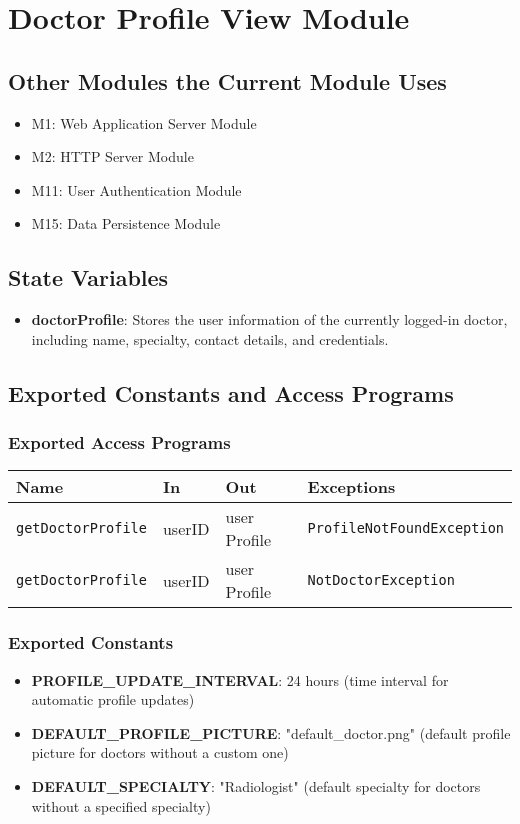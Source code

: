 \documentclass[12pt, titlepage]{article}
\begin{document}
\section{Doctor Profile View Module}

\subsection{Other Modules the Current Module Uses}
\begin{itemize}
    \item M1: Web Application Server Module
    \item M2: HTTP Server Module
    \item M11: User Authentication Module
    \item M15: Data Persistence Module
\end{itemize}

\subsection{State Variables}
\begin{itemize}
    \item \textbf{doctorProfile}: Stores the user information of the currently logged-in doctor, including name, specialty, contact details, and credentials.
\end{itemize}

\subsection{Exported Constants and Access Programs}
\subsubsection{Exported Access Programs}
\begin{tabular}{|l|l|l|l|}
    \hline
    \textbf{Name} & \textbf{In} & \textbf{Out} & \textbf{Exceptions} \\
    \hline 
    \texttt{getDoctorProfile} & userID & user Profile & \texttt{ProfileNotFoundException} \\
    \hline
    \texttt{getDoctorProfile} & userID & user Profile & \texttt{NotDoctorException } \\
    \hline
\end{tabular}

\subsubsection{Exported Constants}
\begin{itemize}
\item \textbf{PROFILE\_UPDATE\_INTERVAL}: 24 hours (time interval for automatic profile updates)
\item \textbf{DEFAULT\_PROFILE\_PICTURE}: "default\_doctor.png" (default profile picture for doctors without a custom one)
\item \textbf{DEFAULT\_SPECIALTY}: "Radiologist" (default specialty for doctors without a specified specialty)
\end{itemize}
\end{document}
